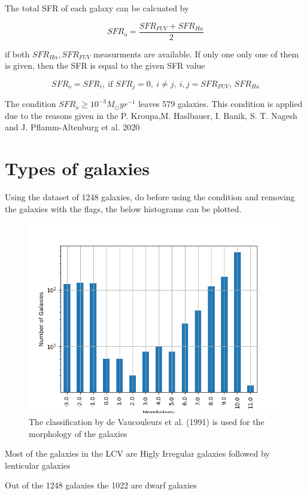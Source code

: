 \documentclass[a4paper]{article}
\begin{document}
The total SFR of each galaxy can be calcuated by

$$
    SFR_o=\frac{SFR_{FUV}+SFR_{Ha}}{2}
$$

if both \(SFR_{H\alpha},SFR_{FUV}\) measurments are available. If only one only one of them is given, then the SFR is equal to the given SFR value

$$
    SFR_o=SFR_i,\ \text{if } SFR_j=0,\ i\neq j,\ i,j=SFR_{FUV},\, SFR_{Ha}
$$

The condition \(SFR_o\geq 10^{-3}M_\odot yr^{-1}\) leaves 579 galaxies. This condition is applied due to the reasons given in the P. Kroupa,M. Haslbauer, I. Banik, S. T. Nagesh and J. Pflamm-Altenburg et al. 2020 \cite{kroupaConstraintsStarFormation2020}

\section{Types of galaxies}
\label{sec:org3f06310}

Using the dataset of 1248 galaxies, do before using the condition and removing the galaxies with the flags, the below histograms can be plotted.

\begin{figure}[htbp]
\centering
\includegraphics[width=.9\linewidth]{./graphs/hist-Type.png}
\caption{\label{Types of galaxies}The classification by de Vaucouleurs et al. (1991) is used for the morphology of the galaxies}
\end{figure}

Most of the galaxies in the LCV are Higly Irregular galaxies followed by lenticular galaxies

Out of the 1248 galaxies the 1022 are dwarf galaxies
\end{document}
